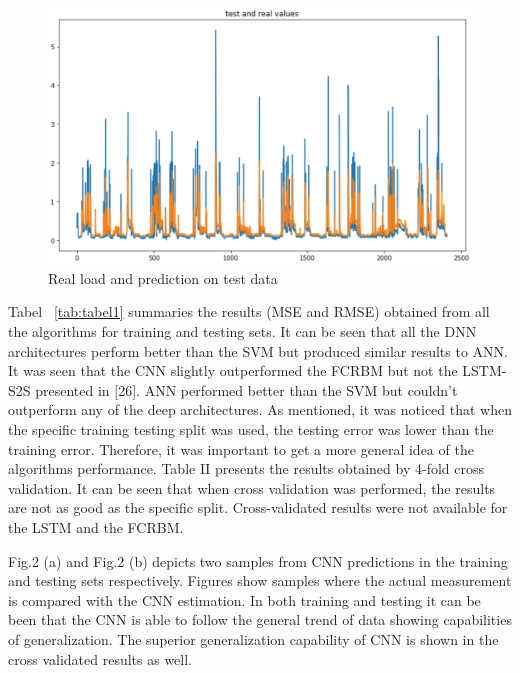 \documentclass[twocolumn, a4paper,10pt]{article}
\begin{document}
\begin{figure}[ht]
    \centering
    \includegraphics[scale=0.2]{img/prediction.jpg}
    \caption{Real load and prediction on test data}
    \label{fig:prediction}
\end{figure}


Tabel ~\ref{tab:tabel1} summaries the results (MSE and RMSE) obtained from all the algorithms for training and testing sets. It can be seen that all the DNN architectures perform better than the SVM but produced similar results to ANN. It was seen that the CNN slightly outperformed the FCRBM but not the LSTM-S2S presented in [26]. ANN performed better than the SVM but couldn’t outperform any of the deep architectures.
As mentioned, it was noticed that when the specific training testing split was used, the testing error was lower than the training error. Therefore, it was important to get a more general idea of the algorithms performance. Table II presents the results obtained by 4-fold cross validation. It can be seen that when cross validation was performed, the results are not as good as the specific split. Cross-validated results were not available for the LSTM and the FCRBM.

Fig.2 (a) and Fig.2 (b) depicts two samples from CNN predictions in the training and testing sets respectively. Figures show samples where the actual measurement is compared with the CNN estimation. In both training and testing it can be been that the CNN is able to follow the general trend of data showing capabilities of generalization. The superior generalization capability of CNN is shown in the cross validated results as well.
\end{document}
